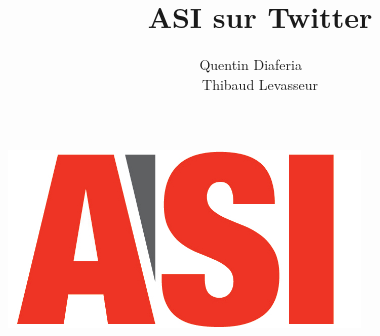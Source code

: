 \documentclass[a4paper,12pt]{article}
\title{ASI sur Twitter}
\author{Quentin Diaferia ~~\\ Thibaud Levasseur}
\begin{document}
\maketitle
\begin{center}
\includegraphics[width=0.7\textwidth]{images/logo.jpg}
\end{center}
\newpage
\tableofcontents

\newpage

\newpage

\newpage

\newpage

\newpage

\end{document}
